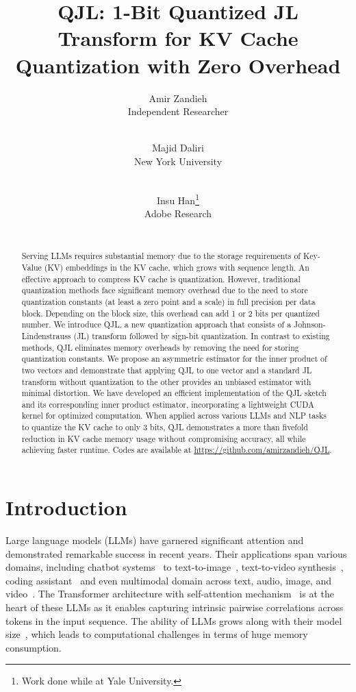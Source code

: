 \documentclass[11pt]{article}
\title{QJL: 1-Bit Quantized JL Transform for KV Cache Quantization with Zero Overhead}
\author{%
  Amir Zandieh \\
  Independent Researcher\\
  \email{amir.zed512@gmail.com} \\
  \and 
  Majid Daliri \\
  New York University \\
  \email{daliri.majid@nyu.edu} \\
  \and
  Insu Han\thanks{Work done while at Yale University.} \\
  Adobe Research \\
  \email{insuh@adobe.com} \\
}
\theoremstyle{plain}
\theoremstyle{definition}
\theoremstyle{remark}
\begin{document}
\maketitle
\begin{abstract}
    Serving LLMs requires substantial memory due to the storage requirements of Key-Value (KV) embeddings in the KV cache, which grows with sequence length. 
    An effective approach to compress KV cache is quantization.
    However, traditional quantization methods face significant memory overhead due to the need to store quantization constants (at least a zero point and a scale) in full precision per data block.
    Depending on the block size, this overhead can add 1 or 2 bits per quantized number.
    We introduce QJL, a new quantization approach that consists of a Johnson-Lindenstrauss (JL) transform followed by sign-bit quantization. 
    In contrast to existing methods, QJL eliminates memory overheads by removing the need for storing quantization constants.
    We propose an asymmetric estimator for the inner product of two vectors and demonstrate that applying QJL to one vector and a standard JL transform without quantization to the other provides an unbiased estimator with minimal distortion.
    We have developed an efficient implementation of the QJL sketch and its corresponding inner product estimator, incorporating a lightweight CUDA kernel for optimized computation.
    When applied across various LLMs and NLP tasks to quantize the KV cache to only 3 bits, QJL demonstrates a more than fivefold reduction in KV cache memory usage without compromising accuracy, all while achieving faster runtime. Codes are available at \url{https://github.com/amirzandieh/QJL}.
\end{abstract}


\section{Introduction}
Large language models (LLMs) have garnered significant attention and demonstrated remarkable success in recent years. 
Their applications span various domains, including chatbot systems~\cite{achiam2023gpt,claude} to text-to-image~\cite{ramesh2022hierarchical,firefly,midjourney}, text-to-video synthesis~\cite{sora}, coding assistant~\cite{copilot} and even multimodal domain across text, audio, image, and video~\cite{gpt4o}. 
The Transformer architecture with self-attention mechanism~\cite{vaswani2017attention} is at the heart of these LLMs as it enables capturing intrinsic pairwise correlations across tokens in the input sequence.
The ability of LLMs grows along with their model size~\cite{kaplan2020scaling}, which leads to computational challenges in terms of huge memory consumption.
\end{document}
